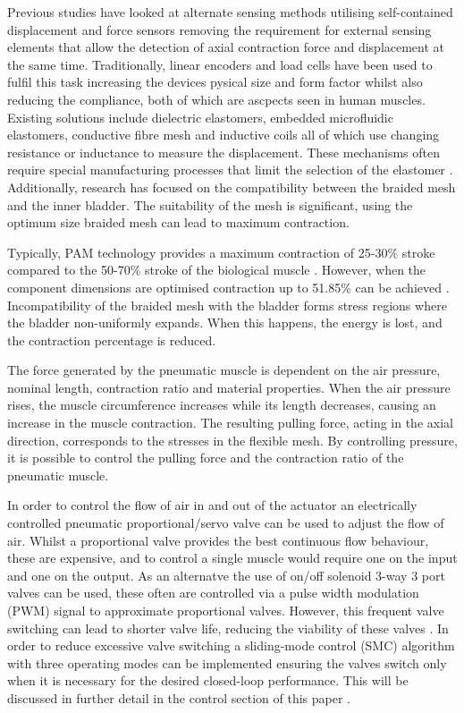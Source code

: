 \documentclass[11pt,a4paper]{article}
\begin{document}
Previous studies have looked at alternate sensing methods utilising self-contained displacement and force sensors removing the requirement for external sensing elements that allow the detection of axial contraction force and displacement at the same time. Traditionally, linear encoders and load cells have been used to fulfil this task increasing the devices pysical size and form factor whilst also reducing the compliance, both of which are ascpects seen in human muscles. Existing solutions include dielectric elastomers, embedded microfluidic elastomers, conductive fibre mesh and inductive coils all of which use changing resistance or inductance to measure the displacement. These mechanisms often require special manufacturing processes that limit the selection of the elastomer \cite{erin_pol_valle_park_2016}. 
Additionally, research has focused on the compatibility between the braided mesh and the inner bladder. The suitability of the mesh is significant, using the optimum size braided mesh can lead to maximum contraction. 

Typically, PAM technology provides a maximum contraction of 25-30\% stroke compared to the 50-70\% stroke of the biological muscle \cite{andrikopoulos_nikolakopoulos_2017}. However, when the component dimensions are optimised contraction up to 51.85\% can be achieved \cite{najmuddin_mustaffa_2017}. Incompatibility of the braided mesh with the bladder forms stress regions where the bladder non-uniformly expands. When this happens, the energy is lost, and the contraction percentage is reduced. \newline

The force generated by the pneumatic muscle is dependent on the air pressure, nominal length, contraction ratio and material properties. When the air pressure rises, the muscle circumference increases while its length decreases, causing an increase in the muscle contraction. The resulting pulling force, acting in the axial direction, corresponds to the stresses in the flexible mesh. By controlling pressure, it is possible to control the pulling force and the contraction ratio of the pneumatic muscle. \newline

In order to control the flow of air in and out of the actuator an electrically controlled pneumatic proportional/servo valve can be used to adjust the flow of air. Whilst a proportional valve provides the best continuous flow behaviour, these are expensive, and to control a single muscle would require one on the input and one on the output. As an alternatve the use of on/off solenoid 3-way 3 port valves can be used, these often are controlled via a pulse width modulation (PWM) signal to approximate proportional valves. However, this frequent valve switching can lead to shorter valve life, reducing the viability of these valves \cite{zhang_bone_2018}. In order to reduce excessive valve switching a sliding-mode control (SMC) algorithm with three operating modes can be implemented ensuring the valves switch only when it is necessary for the desired closed-loop performance. This will be discussed in further detail in the control section of this paper . \newline
\end{document}
